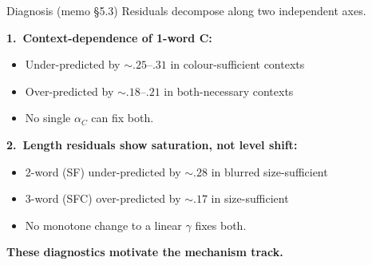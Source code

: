 \documentclass[10pt,aspectratio=169]{beamer}
\newcommand{\hl}[1]{{\color{hlblue}\textbf{#1}}}
\begin{document}
\begin{frame}{Diagnosis (memo \S5.3)}
Residuals decompose along two independent axes.

\vspace{0.5em}
\textbf{1.~Context-dependence of 1-word C:}
\begin{itemize}\itemsep0.1em
  \item Under-predicted by $\sim.25$--$.31$ in colour-sufficient contexts
  \item Over-predicted by $\sim.18$--$.21$ in both-necessary contexts
  \item No single $\alpha_C$ can fix both.
\end{itemize}

\vspace{0.5em}
\textbf{2.~Length residuals show saturation, not level shift:}
\begin{itemize}\itemsep0.1em
  \item 2-word (SF) under-predicted by $\sim.28$ in blurred size-sufficient
  \item 3-word (SFC) over-predicted by $\sim.17$ in size-sufficient
  \item No monotone change to a linear $\gamma$ fixes both.
\end{itemize}

\vspace{0.5em}
\hl{These diagnostics motivate the mechanism track.}
\end{frame}
\end{document}
